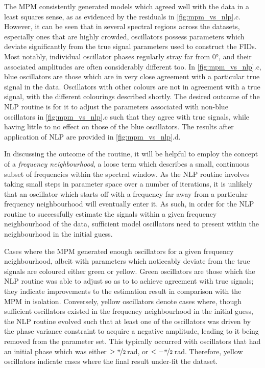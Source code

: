 The \ac{MPM} consistently generated models which agreed well with the data
in a least squares sense, as as evidenced by the residuals in
\cref{fig:mpm_vs_nlp}.c.
However, it can be seen that in several spectral regions across the datasets,
especially ones that are highly crowded, oscillators possess parameters which
deviate significantly from the true signal parameters used to construct the
\acp{FID}.
Most notably, individual oscillator phases regularly stray far from \ang{0},
and their associated amplitudes are often considerably different too.
In \cref{fig:mpm_vs_nlp}.c, blue oscillators are those which
are in very close agreement with a particular true signal in the data.
Oscillators with other colours are not in agreement with a true signal,
with the different colourings described shortly.
The desired outcome of the \ac{NLP} routine is for it to adjust the
parameters associated with non-blue oscillators in \cref{fig:mpm_vs_nlp}.c such
that they agree with true signals, while having little to no effect on those of
the blue oscillators. The results after application of \ac{NLP} are provided in
\cref{fig:mpm_vs_nlp}.d.

In discussing the outcome of the routine, it will be helpful to employ the
concept of a \emph{frequency neighbourhood}, a loose term which describes a
small, continuous subset of frequencies within the spectral window. As the
\ac{NLP} routine involves taking small steps
in parameter space over a number of iterations, it is unlikely that an
oscillator which starts off with a frequency far away from a particular
frequency neighbourhood will eventually enter it. As such, in order for the
\ac{NLP} routine to successfully estimate the signals within a given frequency
neighbourhood of the data, sufficient model oscillators need to present within
the neighbourhood in the initial guess.

Cases where the
\ac{MPM} generated enough oscillators for a given frequency neighbourhood,
albeit with parameters which noticeably deviate from the true signals are
coloured either green or yellow. Green oscillators are those which the \ac{NLP} routine
was able to adjust so as to to achieve agreement with true signals;
they indicate improvements to the estimation result in comparison with the \ac{MPM}
in isolation. Conversely, yellow oscillators denote cases where, though
sufficient oscillators existed in the frequency neighbourhood in the initial
guess, the \ac{NLP} routine evolved such that at least one of the oscillators
was driven by the phase variance constraint to acquire a negative amplitude,
leading to it being removed from the parameter set. This typically occurred with
oscillators that had an initial phase which was either $>
\nicefrac{\pi}{2}$\,\unit{\radian}, or $< -\nicefrac{\pi}{2}$\,\unit{\radian}.
Therefore, yellow oscillators indicate cases where the final result
under-fit the dataset.

